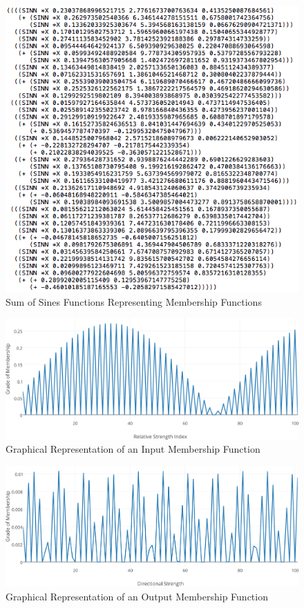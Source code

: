 \documentclass[12pt,journal,draftcls,onecolumn]{IEEEtran}
\begin{document}
\begin{figure}[h!]
\caption{Sum of Sines Functions Representing Membership Functions}
\label{sum-of-sines-mfs}
\begin{center}
\includegraphics[width=0.7\columnwidth]{figures/mfs-lisp-example/mfs-lisp-example.png}
\end{center}
\end{figure}

\begin{figure}[h!]
\caption{Graphical Representation of an Input Membership Function}
\label{input-mf}
\begin{center}
\includegraphics[width=1\columnwidth]{figures/mf-input/mf-input.png}
\end{center}
\end{figure}

\begin{figure}[h!]
\caption{Graphical Representation of an Output Membership Function}
\label{output-mf}
\begin{center}
\includegraphics[width=1\columnwidth]{figures/mf-output/mf-output.png}
\end{center}
\end{figure}
\end{document}
